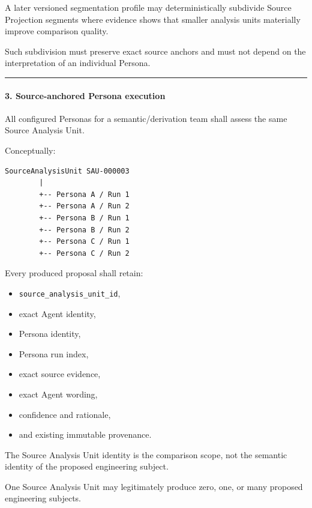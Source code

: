 A later versioned segmentation profile may deterministically subdivide Source Projection segments where evidence shows that smaller analysis units materially improve comparison quality.

Such subdivision must preserve exact source anchors and must not depend on the interpretation of an individual Persona.

\begin{center}\rule{0.5\linewidth}{0.5pt}\end{center}

\hypertarget{3-source-anchored-persona-execution}{%
\paragraph{3. Source-anchored Persona execution}\label{3-source-anchored-persona-execution}}

All configured Personas for a semantic/derivation team shall assess the same Source Analysis Unit.

Conceptually:

\begin{verbatim}
SourceAnalysisUnit SAU-000003
        |
        +-- Persona A / Run 1
        +-- Persona A / Run 2
        +-- Persona B / Run 1
        +-- Persona B / Run 2
        +-- Persona C / Run 1
        +-- Persona C / Run 2
\end{verbatim}

Every produced proposal shall retain:

\begin{itemize}
\tightlist
\item
  \texttt{source\_analysis\_unit\_id},
\item
  exact Agent identity,
\item
  Persona identity,
\item
  Persona run index,
\item
  exact source evidence,
\item
  exact Agent wording,
\item
  confidence and rationale,
\item
  and existing immutable provenance.
\end{itemize}

The Source Analysis Unit identity is the comparison scope, not the semantic identity of the proposed engineering subject.

One Source Analysis Unit may legitimately produce zero, one, or many proposed engineering subjects.

